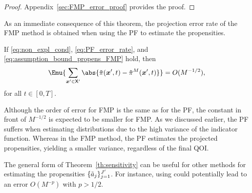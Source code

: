 \begin{proof}
    Appendix~\ref{sec:FMP_error_proof} provides the proof.
\end{proof}

As an immediate consequence of this theorem, the projection error rate of the \ac{FMP} method is obtained when using the \ac{PF} to estimate the propensities.

\begin{corollary}
\label{corollary:FMP_error_PF}
     If \eqref{eq:non_expl_cond}, \eqref{eq:PF_error_rate}, and \eqref{eq:assumption_bound_propens_FMP} hold, then 
    \begin{equation}
    \label{eq:projection_error_pi}
        \Emu{ \sum_{\boldsymbol{x}' \in \mathsf{X}'} \abs{ \Tilde{\pi}(\boldsymbol{x}', t) - \Tilde{\pi}^M(\boldsymbol{x}', t) }} =  O(M^{-1/2}),
    \end{equation}
    for all $t \in [0, T]$.
\end{corollary}


Although the order of error for \ac{FMP} is the same as for the \ac{PF}, the constant in front of $M^{-1/2}$ is expected to be smaller for \ac{FMP}. As we discussed earlier, the \ac{PF} suffers when estimating distributions due to the high variance of the indicator function. Whereas in the \ac{FMP} method, the \ac{PF} estimates the projected propensities, yielding a smaller variance, regardless of the final \ac{QOI}.

\begin{remark}
    The general form of Theorem~\ref{th:sensitivity} can be useful for other methods for estimating the propensities $\{\Tilde{a}_j\}_{j=1}^{J'}$. For instance, using \cite{leluc2023speeding, gerber2015sequential} could potentially lead to an error $O(M^{-p})$ with $p > 1/2$.
\end{remark}


